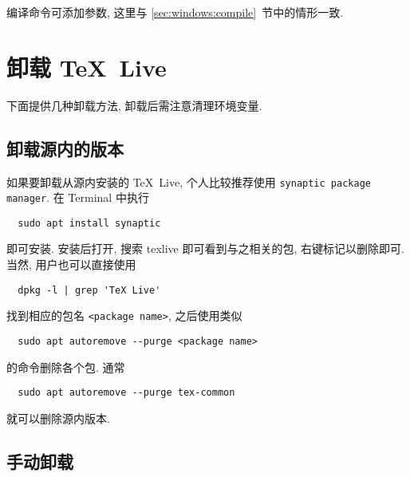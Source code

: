 编译命令可添加参数, 这里与 \ref{sec:windows:compile}~节中的情形一致.

\section{卸载 \TeX~Live}\label{sec:ubuntu:uninstall}

下面提供几种卸载方法,
卸载后需注意清理环境变量.

\subsection{卸载源内的版本}\label{sec:ubuntu:aptremove}

如果要卸载从源内安装的 \TeX~Live, 个人比较推荐使用 \texttt{synaptic package manager}.
在 \textsf{Terminal} 中执行
\begin{lstlisting}
  sudo apt install synaptic
\end{lstlisting}
即可安装.
安装后打开, 搜索 \textsf{texlive} 即可看到与之相关的包, 右键标记以删除即可.
当然, 用户也可以直接使用
\begin{lstlisting}
  dpkg -l | grep 'TeX Live'
\end{lstlisting}
找到相应的包名 \texttt{<package name>}, 之后使用类似
\begin{lstlisting}
  sudo apt autoremove --purge <package name>
\end{lstlisting}
的命令删除各个包.
通常
\begin{lstlisting}
  sudo apt autoremove --purge tex-common
\end{lstlisting}
就可以删除源内版本.

\subsection{手动卸载}

